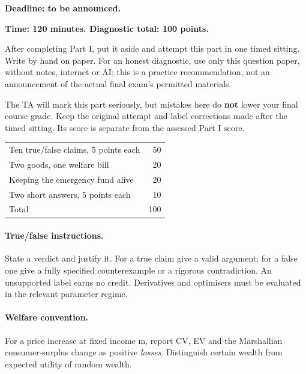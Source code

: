 \label{mock-start}
\textbf{Deadline: to be announced.}

\textbf{Time: 120 minutes. Diagnostic total: 100 points.}

After completing Part I, put it aside and attempt this part in one timed
sitting. Write by hand on paper. For an honest diagnostic, use only this
question paper, without notes, internet or AI; this is a practice recommendation,
not an announcement of the actual final exam's permitted materials.

The TA will mark this part seriously, but mistakes here do \textbf{not}
lower your final course grade. Keep the original attempt and label corrections
made after the timed sitting. Its score is separate from the assessed Part I score.

\begin{center}\begin{tabular}{lr}
Ten true/false claims, 5 points each & 50\\
Two goods, one welfare bill & 20\\
Keeping the emergency fund alive & 20\\
Two short answers, 5 points each & 10\\\hline
Total & 100
\end{tabular}\end{center}

\paragraph{True/false instructions.} State a verdict and justify it.
For a true claim give a valid argument; for a false one give a fully specified
counterexample or a rigorous contradiction. An unsupported label earns no credit.
Derivatives and optimisers must be evaluated in the relevant parameter regime.

\paragraph{Welfare convention.} For a price increase at fixed income m,
report CV, EV and the Marshallian consumer-surplus change as positive
\emph{losses}. Distinguish certain wealth from expected utility of random wealth.
